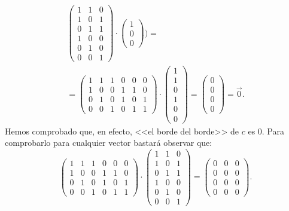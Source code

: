 \documentclass[12pt, a4paper, twoside]{book}
\numberwithin{equation}{section}
\theoremstyle{definition}
\newenvironment{ejem}
  {\pushQED{\qed}\renewcommand{\qedsymbol}{$\blacktriangleleft$}\ejemplo}
  {\popQED\endejemplo}
\theoremstyle{remark}
\theoremstyle{plain}
\begin{document}
\begin{ejem}
\begin{equation*}
\begin{split}
\begin{pmatrix}
				1 & 1 & 0 \\
				1 & 0 & 1 \\
				0 & 1 & 1 \\
				1 & 0 & 0 \\
				0 & 1 & 0 \\
				0 & 0 & 1
				\end{pmatrix}
				\cdot
				\begin{pmatrix}
				1 \\
				0 \\
				0 
				\end{pmatrix} \Bigg ) = \\
				=\begin{pmatrix}
				1 & 1 & 1 & 0 & 0 &0 \\
				1 & 0 & 0 & 1 & 1 &0 \\
				0 & 1 & 0 & 1 & 0 &1 \\
				0 & 0 & 1 & 0 & 1 &1
				\end{pmatrix}
				\cdot
				\begin{pmatrix}
				1 \\
				1 \\
				0 \\
				1 \\
				0 \\
				0
				\end{pmatrix} =
				\begin{pmatrix}
                                0 \\
				0 \\
				0 \\
				0
				\end{pmatrix}=
				\vec{0}.
			\end{split}
		\end{equation*}
		Hemos comprobado que, en efecto, <<el borde del borde>> de 
		$c$ es 0. Para comprobarlo para cualquier vector bastará 
		observar que:
		\begin{equation*}
		\begin{pmatrix}
				1 & 1 & 1 & 0 & 0 &0 \\
				1 & 0 & 0 & 1 & 1 &0 \\
				0 & 1 & 0 & 1 & 0 &1 \\
				0 & 0 & 1 & 0 & 1 &1
			\end{pmatrix}\cdot 
				\begin{pmatrix}
				1 & 1 & 0 \\
				1 & 0 & 1 \\
				0 & 1 & 1 \\
				1 & 0 & 0 \\
				0 & 1 & 0 \\
				0 & 0 & 1
				\end{pmatrix}
				=
				\begin{pmatrix}
				0 & 0 & 0 \\
				0 & 0 & 0 \\
				0 & 0 & 0 \\
				0 & 0 & 0 
				\end{pmatrix}.
		\end{equation*}
	\end{ejem}
\end{document}

